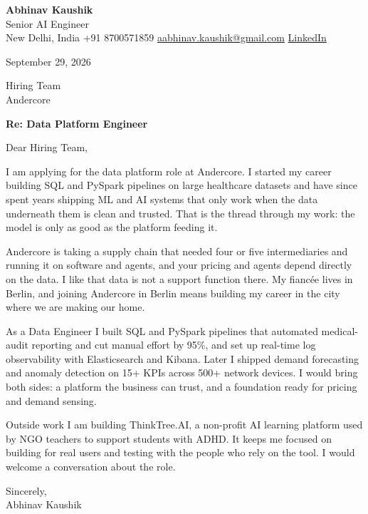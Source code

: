 \documentclass[11pt,a4paper]{article}
\begin{document}
{\Large\bfseries Abhinav Kaushik}\\
Senior AI Engineer\\
New Delhi, India \textbar{} +91 8700571859 \textbar{} \href{mailto:aabhinav.kaushik@gmail.com}{aabhinav.kaushik@gmail.com} \textbar{} \href{https://www.linkedin.com/in/abhinav-kaushik10/}{LinkedIn}  

September 29, 2026

Hiring Team\\
Andercore

\textbf{Re: Data Platform Engineer}

Dear Hiring Team,

I am applying for the data platform role at Andercore. I started my career building SQL and PySpark pipelines on large healthcare datasets and have since spent years shipping ML and AI systems that only work when the data underneath them is clean and trusted. That is the thread through my work: the model is only as good as the platform feeding it.

Andercore is taking a supply chain that needed four or five intermediaries and running it on software and agents, and your pricing and agents depend directly on the data. I like that data is not a support function there. My fiancée lives in Berlin, and joining Andercore in Berlin means building my career in the city where we are making our home.

As a Data Engineer I built SQL and PySpark pipelines that automated medical-audit reporting and cut manual effort by 95\%, and set up real-time log observability with Elasticsearch and Kibana. Later I shipped demand forecasting and anomaly detection on 15+ KPIs across 500+ network devices. I would bring both sides: a platform the business can trust, and a foundation ready for pricing and demand sensing.

Outside work I am building ThinkTree.AI, a non-profit AI learning platform used by NGO teachers to support students with ADHD. It keeps me focused on building for real users and testing with the people who rely on the tool. I would welcome a conversation about the role.

Sincerely,\\[4pt]
Abhinav Kaushik
\end{document}
